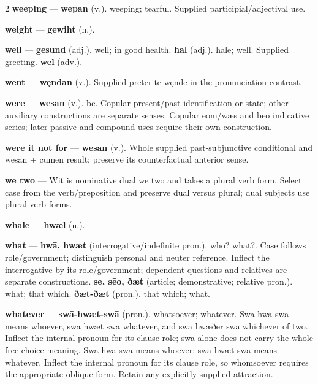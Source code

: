 \begin{multicols}{2}
\textbf{weeping} — \textbf{wēpan} (v.). weeping; tearful. Supplied participial/adjectival use.\par
\textbf{weight} — \textbf{gewiht} (n.).\par
\textbf{well} — \textbf{gesund} (adj.). well; in good health. \textbf{hāl} (adj.). hale; well. Supplied greeting. \textbf{wel} (adv.).\par
\textbf{went} — \textbf{węndan} (v.). Supplied preterite węnde in the pronunciation contrast.\par
\textbf{were} — \textbf{wesan} (v.). be. Copular present/past identification or state; other auxiliary constructions are separate senses. Copular eom/wæs and bēo indicative series; later passive and compound uses require their own construction.\par
\textbf{were it not for} — \textbf{wesan} (v.). Whole supplied past-subjunctive conditional and wesan + cumen result; preserve its counterfactual anterior sense.\par
\textbf{we two} — Wit is nominative dual we two and takes a plural verb form. Select case from the verb/preposition and preserve dual versus plural; dual subjects use plural verb forms.\par
\textbf{whale} — \textbf{hwæl} (n.).\par
\textbf{what} — \textbf{hwā, hwæt} (interrogative/indefinite pron.). who? what?. Case follows role/government; distinguish personal and neuter reference. Inflect the interrogative by its role/government; dependent questions and relatives are separate constructions. \textbf{se, sēo, ðæt} (article; demonstrative; relative pron.). what; that which. \textbf{ðæt-ðæt} (pron.). that which; what.\par
\textbf{whatever} — \textbf{swā-hwæt-swā} (pron.). whatsoever; whatever. Swā hwā swā means whoever, swā hwæt swā whatever, and swā hwæðer swā whichever of two. Inflect the internal pronoun for its clause role; swā alone does not carry the whole free-choice meaning. Swā hwā swā means whoever; swā hwæt swā means whatever. Inflect the internal pronoun for its clause role, so whomsoever requires the appropriate oblique form. Retain any explicitly supplied attraction.\par

\end{multicols}
